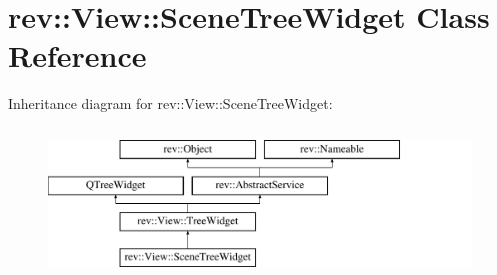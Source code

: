\hypertarget{classrev_1_1_view_1_1_scene_tree_widget}{}\section{rev\+::View\+::Scene\+Tree\+Widget Class Reference}
\label{classrev_1_1_view_1_1_scene_tree_widget}
Inheritance diagram for rev\+::View\+::Scene\+Tree\+Widget\+:\begin{figure}[H]
\begin{center}
\leavevmode
\includegraphics[height=4.000000cm]{classrev_1_1_view_1_1_scene_tree_widget}
\end{center}
\end{figure}
